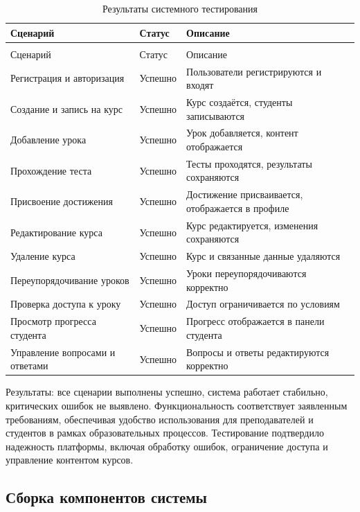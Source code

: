 \begin{xltabular}{\textwidth}{|X|l|X|}
	\caption{Результаты системного тестирования\label{tab:system_testing_results}}\\
	\hline
	Сценарий & Статус & Описание \\ \hline
	\endfirsthead
	\\
	\hline
	Сценарий & Статус & Описание \\ \hline
	\endhead
	Регистрация и авторизация & Успешно & Пользователи регистрируются и входят \\ \hline
	Создание и запись на курс & Успешно & Курс создаётся, студенты записываются \\ \hline
	Добавление урока & Успешно & Урок добавляется, контент отображается \\ \hline
	Прохождение теста & Успешно & Тесты проходятся, результаты сохраняются \\ \hline
	Присвоение достижения & Успешно & Достижение присваивается, отображается в профиле \\ \hline
	Редактирование курса & Успешно & Курс редактируется, изменения сохраняются \\ \hline
	Удаление курса & Успешно & Курс и связанные данные удаляются \\ \hline
	Переупорядочивание уроков & Успешно & Уроки переупорядочиваются корректно \\ \hline
	Проверка доступа к уроку & Успешно & Доступ ограничивается по условиям \\ \hline
	Просмотр прогресса студента & Успешно & Прогресс отображается в панели студента \\ \hline
	Управление вопросами и ответами & Успешно & Вопросы и ответы редактируются корректно \\ \hline
\end{xltabular}

Результаты: все сценарии выполнены успешно, система работает стабильно, критических ошибок не выявлено. Функциональность соответствует заявленным требованиям, обеспечивая удобство использования для преподавателей и студентов в рамках образовательных процессов. Тестирование подтвердило надежность платформы, включая обработку ошибок, ограничение доступа и управление контентом курсов.

\subsection{Сборка компонентов системы}


